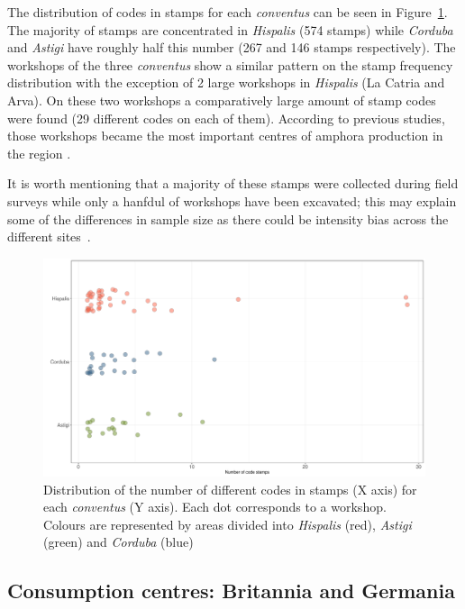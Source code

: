 The distribution of codes in stamps for each \textit{conventus} can be seen in Figure~\ref{frequency}. The majority of stamps are concentrated in \textit{Hispalis} (574 stamps) while \textit{Corduba} and \textit{Astigi} have roughly half this number (267 and 146 stamps respectively). The workshops of the three \textit{conventus} show a similar pattern on the stamp frequency distribution with the exception of 2 large workshops in \textit{Hispalis} (La Catria and Arva). On these two workshops a comparatively large amount of stamp codes were found (29 different codes on each of them). According to previous studies, those workshops became the most important centres of amphora production in the region \citep{rodriguez_economioleicola_1977,arva_1997}.

It is worth mentioning that a majority of these stamps were collected during field surveys while only a hanfdul of workshops have been excavated; this may explain some of the differences in sample size as there could be intensity bias across the different sites~\citep{arva_1997}.
 
\begin{figure}[htp]
	\centering
\includegraphics[width=\linewidth]{frequency}
\caption{Distribution of the number of different codes in stamps (X axis) for each \textit{conventus} (Y axis). Each dot corresponds to a workshop. Colours are represented by areas divided into \textit{Hispalis} (red), \textit{Astigi} (green) and \textit{Corduba} (blue)}
\label{frequency}
\end{figure} 


\subsection{Consumption centres: Britannia and Germania}
\label{sec:5}

